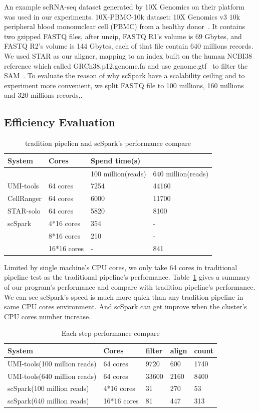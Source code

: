 \documentclass[runningheads]{llncs}
\begin{document}
An example scRNA-seq dataset generated by 10X Genomics on their platform was used in our experiments.
10X-PBMC-10k dataset: 10X Genomics v3 10k peripheral blood mononuclear cell (PBMC) from a healthy donor~\cite{ref_url4}. 
It contains two gzipped FASTQ files, after unzip, FASTQ R1's volume is 69 Gbytes, and FASTQ R2's volume is 144 Gbytes, each of that file contain 640 millions records.
We used STAR as our aligner, mapping to an index built on the human NCBI38 reference which called GRCh38.p12.genome.fa and use genome.gtf~\cite{ref_url5} to filter the SAM~\cite{ref_url5}.
To evaluate the reason of why scSpark have a scalability ceiling and to experiment more convenient, we split FASTQ file to 100 millions, 160 millions and 320 millions records,.
\subsection{Efficiency Evaluation}
\begin{table}
  \centering
  \caption{tradition pipelien and scSpark's performance compare}\label{tab1}
  \begin{tabular}{l | l | l  l}
  \hline
  System &  Cores & Spend time(s) \\
  \hline
   &  & 100 million(reads) & 640 million(reads) \\
  \hline
  UMI-tools & 64 cores & 7254 & 44160 \\
  \hline
  CellRanger & 64 cores & 6000 & 11700 \\
  \hline
  STAR-solo & 64 cores &  5820 & 8100 \\
  \hline
  scSpark & 4*16 cores & 354 & - \\
   & 8*16 cores & 210 & - \\
   & 16*16 cores & - & 841 \\
  \hline
  \end{tabular}
\end{table}
Limited by single machine's CPU cores, we only take 64 cores in traditional pipeline test as the traditional pipeline's performance.
Table~\ref{tab1} gives a summary of our program's performance and compare with tradition pipeline's performance.
We can see scSpark's speed is much more quick than any tradition pipeline in same CPU cores environment.
And scSpark can get improve when the cluster's CPU cores number increase.
\begin{table}
  \centering
  \caption{Each step performance compare}\label{tab2}
  \begin{tabular}{l | l | l | l | l}
  \hline
  System & Cores & filter & align & count \\
  \hline
  UMI-tools(100 million reads) & 64 cores & 9720 & 600 & 1740 \\
  \hline
  UMI-tools(640 million reads) & 64 cores & 33600 & 2160 & 8400 \\
  \hline
  scSpark(100 million reads) & 4*16 cores & 31 & 270 & 53 \\
  \hline
  scSpark(640 million reads) & 16*16 cores & 81 & 447 & 313 \\
  \hline
  \end{tabular}
\end{table}
\end{document}
